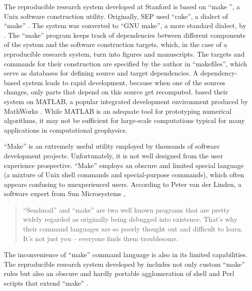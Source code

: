 The reproducible research system developed at Stanford is based on
``make \cite[]{make}'', a Unix software construction utility.
Originally, SEP used ``cake'', a dialect of ``make''
\cite[]{Nichols.sep.61.341,Claerbout.sep.67.145,Claerbout.sep.73.451,Claerbout.sep.77.427}.
The system was converted to ``GNU make'', a more standard dialect, by
\cite{Schwab.sep.89.217}.  The ``make'' program keeps track of
dependencies between different components of the system and the
software construction targets, which, in the case of a reproducible
research system, turn into figures and manuscripts. The targets and
commands for their construction are specified by the author in
``makefiles'', which serve as databases for defining source and target
dependencies. A dependency-based system leads to rapid development,
because when one of the sources changes, only parts that depend on
this source get recomputed.  \cite{donoho} based their system on
MATLAB, a popular integrated development environment produced by
MathWorks \cite[]{matlab}.  While MATLAB is an adequate tool for
prototyping numerical algorithms, it may not be sufficient for
large-scale computations typical for many applications in
computational geophysics.

``Make'' is an extremely useful utility employed by thousands of
software development projects. Unfortunately, it is not
well designed from the user experience prospective. ``Make'' employs
an obscure and limited special language (a mixture of Unix shell
commands and special-purpose commands), which often appears confusing
to unexperienced users. According to Peter van der Linden, a software
expert from Sun Microsystems \cite[]{linden},
\begin{quote}
  ``Sendmail'' and ``make'' are two well known programs that are
  pretty widely regarded as originally being debugged into existence.
  That's why their command languages are so poorly thought out and
  difficult to learn. It's not just you -- everyone finds them
  troublesome.
\end{quote}
The inconvenience of ``make'' command language is also in its limited
capabilities.  The reproducible research system developed by
\cite{matt} includes not only custom ``make'' rules but also an
obscure and hardly portable agglomeration of shell and Perl scripts
that extend ``make'' \cite[]{Fomel.sep.94.matt3}.

